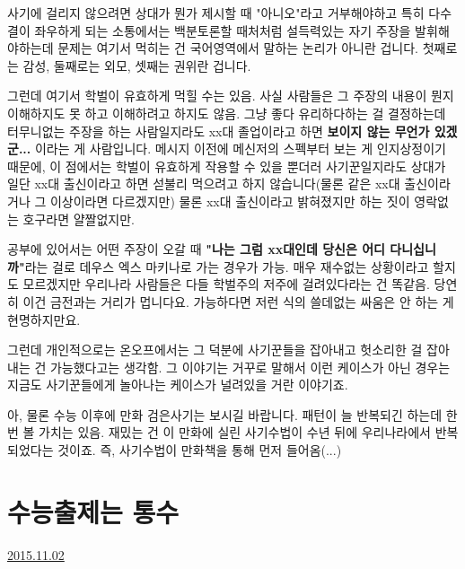 사기에 걸리지 않으려면 상대가 뭔가 제시할 때 "아니오"라고 거부해야하고
특히 다수결이 좌우하게 되는 소통에서는 백분토론할 때처처럼 설득력있는 자기 주장을 발휘해야하는데
문제는 여기서 먹히는 건 국어영역에서 말하는 논리가 아니란 겁니다. 첫째로는 감성, 둘째로는 외모, 셋째는 권위란 겁니다.
\vspace{5mm}

그런데 여기서 학벌이 유효하게 먹힐 수는 있음.
사실 사람들은 그 주장의 내용이 뭔지 이해하지도 못 하고 이해하려고 하지도 않음. 그냥 좋다 유리하다하는 걸 결정하는데
터무니없는 주장을 하는 사람일지라도 xx대 졸업이라고 하면 \textbf{보이지 않는 무언가 있겠군...} 이라는 게 사람입니다.
메시지 이전에 메신저의 스펙부터 보는 게 인지상정이기 때문에, 이 점에서는 학벌이 유효하게 작용할 수 있을 뿐더러
사기꾼일지라도 상대가 일단 xx대 출신이라고 하면 섣불리 먹으려고 하지 않습니다(물론 같은 xx대 출신이라거나 그 이상이라면 다르겠지만)
물론 xx대 출신이라고 밝혀졌지만 하는 짓이 영락없는 호구라면 얄짤없지만.
\vspace{5mm}

공부에 있어서는 어떤 주장이 오갈 때 \textbf{"나는 그럼 xx대인데 당신은 어디 다니십니까"}라는 걸로 데우스 엑스 마키나로 가는 경우가 가능.
매우 재수없는 상황이라고 할지도 모르겠지만 우리나라 사람들은 다들 학벌주의 저주에 걸려있다라는 건 똑같음.
당연히 이건 금전과는 거리가 멉니다요. 가능하다면 저런 식의 쓸데없는 싸움은 안 하는 게 현명하지만요.
\vspace{5mm}

그런데 개인적으로는 온오프에서는 그 덕분에 사기꾼들을 잡아내고 헛소리한 걸 잡아내는 건 가능했다고는 생각함.
그 이야기는 거꾸로 말해서 이런 케이스가 아닌 경우는 지금도 사기꾼들에게 놀아나는 케이스가 널려있을 거란 이야기죠.
\vspace{5mm}

아, 물론 수능 이후에 만화 검은사기는 보시길 바랍니다. 패턴이 늘 반복되긴 하는데 한번 볼 가치는 있음.
재밌는 건 이 만화에 실린 사기수법이 수년 뒤에 우리나라에서 반복되었다는 것이죠. 즉, 사기수법이 만화책을 통해 먼저 들어옴(...)
\vspace{5mm}






\section{수능출제는 통수}
\href{https://www.kockoc.com/Apoc/461252}{2015.11.02}

\vspace{5mm}

